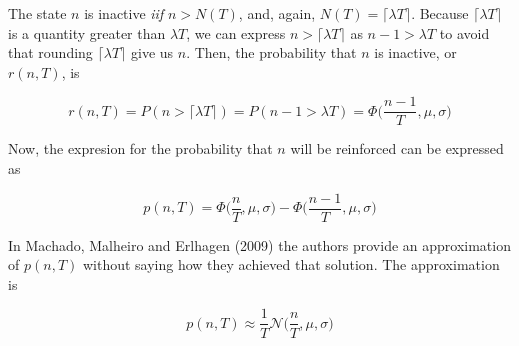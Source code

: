 \documentclass[11pt]{article}
\begin{document}
    The state $n$ is inactive \textit{iif} $n > N(T)$, and, again, $N(T) = \lceil \lambda T \rceil$.
    Because $\lceil \lambda T \rceil$ is a quantity greater than $\lambda T$, we can express $n > \lceil \lambda T \rceil$
    as $n - 1 > \lambda T$ to avoid that rounding $\lceil \lambda T \rceil$ give us $n$.
    Then, the probability that $n$ is inactive, or $r(n,T)$, is

    \[
        r(n,T) = P(n > \lceil \lambda T \rceil) = P(n - 1 > \lambda T) = \Phi \Big( \frac{n-1}{T},\mu,\sigma \Big)
    \]

    Now, the expresion for the probability that $n$ will be reinforced can be expressed as

    \[
        p(n,T) = \Phi \Big ( \frac{n}{T}, \mu, \sigma \Big) - \Phi \Big ( \frac{n - 1}{T},\mu,\sigma \Big)
    \]

    In Machado, Malheiro and Erlhagen (2009) the authors provide an approximation of $p(n,T)$ without saying how they
    achieved that solution. The approximation is

    \[
        p(n,T) \approx \frac{1}{T} \mathcal{N} \Big(\frac{n}{T},\mu,\sigma \Big)
    \]
\end{document}
